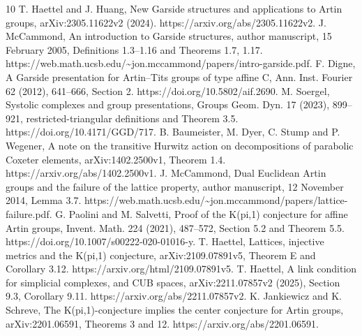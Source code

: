 \documentclass[10pt]{article}
\begin{document}
10 T. Haettel and J. Huang, New Garside structures and applications to Artin groups, arXiv:2305.11622v2 (2024). https://arxiv.org/abs/2305.11622v2. J. McCammond, An introduction to Garside structures, author manuscript, 15 February 2005, Definitions 1.3–1.16 and Theorems 1.7, 1.17. https://web.math.ucsb.edu/\textasciitilde{}jon.mccammond/papers/intro-garside.pdf. F. Digne, A Garside presentation for Artin–Tits groups of type affine C, Ann. Inst. Fourier 62 (2012), 641–666, Section 2. https://doi.org/10.5802/aif.2690. M. Soergel, Systolic complexes and group presentations, Groups Geom. Dyn. 17 (2023), 899–921, restricted-triangular definitions and Theorem 3.5. https://doi.org/10.4171/GGD/717. B. Baumeister, M. Dyer, C. Stump and P. Wegener, A note on the transitive Hurwitz action on decompositions of parabolic Coxeter elements, arXiv:1402.2500v1, Theorem 1.4. https://arxiv.org/abs/1402.2500v1. J. McCammond, Dual Euclidean Artin groups and the failure of the lattice property, author manuscript, 12 November 2014, Lemma 3.7. https://web.math.ucsb.edu/\textasciitilde{}jon.mccammond/papers/lattice-failure.pdf. G. Paolini and M. Salvetti, Proof of the K(pi,1) conjecture for affine Artin groups, Invent. Math. 224 (2021), 487–572, Section 5.2 and Theorem 5.5. https://doi.org/10.1007/s00222-020-01016-y. T. Haettel, Lattices, injective metrics and the K(pi,1) conjecture, arXiv:2109.07891v5, Theorem E and Corollary 3.12. https://arxiv.org/html/2109.07891v5. T. Haettel, A link condition for simplicial complexes, and CUB spaces, arXiv:2211.07857v2 (2025), Section 9.3, Corollary 9.11. https://arxiv.org/abs/2211.07857v2. K. Jankiewicz and K. Schreve, The K(pi,1)-conjecture implies the center conjecture for Artin groups, arXiv:2201.06591, Theorems 3 and 12. https://arxiv.org/abs/2201.06591.\par
\end{document}
